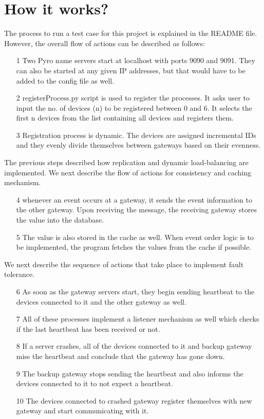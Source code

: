 \documentclass[12pt]{article}
\begin{document}
\section{How it works?}
The process to run a test case for this project is explained in the README file. However, the overall
 flow of actions can be described as follows:
 
 \begin{itemize}
 	\item[1] Two Pyro name servers start at localhost with ports 9090 and 9091. They can also be started at 
 	any given IP addresses, but that would have to be added to the config file as well.
 	\item[2] registerProcess.py script is used to register the processes. It asks user to input the no. of 
 	devices (n) to be registered between 0 and 6. It selects the first n devices from the list containing all
 	devices and registers them. 
 	\item[3] Registration process is dynamic. The devices are assigned incremental IDs and they evenly 
 	divide themselves between gateways based on their evenness. 
 \end{itemize}

The previous steps described how replication and dynamic load-balancing are implemented. 
We next describe the flow of actions for consistency and caching mechanism. 

\begin{itemize}
	\item[4] whenever an event occurs at a gateway, it sends the event information to the other gateway. 
	Upon receiving the message, the receiving gateway stores the value into the database. 
	\item[5] The value is also stored in the cache as well. When event order logic is to be implemented, 
	the program fetches the values from the cache if possible. 
\end{itemize}

We next describe the sequence of actions that take place to implement fault tolerance. 

\begin{itemize}
	\item[6] As soon as the gateway servers start, they begin sending heartbeat to the 
	devices connected to it and the other gateway as well. 
	\item[7] All of these processes implement a listener mechanism as well which checks 
	if the last heartbeat has been received or not. 
	\item[8] If a server crashes, all of the devices connected to it and backup gateway miss the 
	heartbeat and conclude that the gateway has gone down. 
	\item[9] The backup gateway stops sending the heartbeat and also informs the devices 
	connected to it to not expect a heartbeat. 
	\item[10] The devices connected to crashed gateway register themselves with new gateway 
	and start communicating with it. 
\end{itemize}
\end{document}
